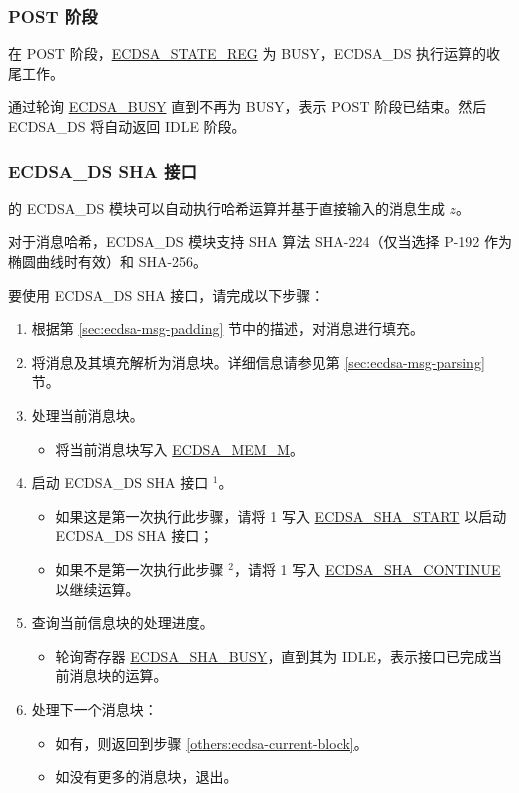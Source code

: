 \documentclass[main\_\_CN.tex]{subfiles}
\begin{document}
\subsubsection{POST 阶段}

在 POST 阶段，\hyperref[regdesc:ECDSASTATEREG]{ECDSA\_STATE\_REG} 为 BUSY，ECDSA\_DS 执行运算的收尾工作。

通过轮询 \hyperref[fielddesc:ECDSABUSY]{ECDSA\_BUSY} 直到不再为 BUSY，表示 POST 阶段已结束。然后 ECDSA\_DS 将自动返回 IDLE 阶段。

\subsubsection{ECDSA\_DS SHA 接口}
\label{sec:ecdsa-sha-interface}
\chipseries{} 的 ECDSA\_DS 模块可以自动执行哈希运算并基于直接输入的消息生成 $z$。

对于消息哈希，ECDSA\_DS 模块支持 SHA 算法 SHA-224（仅当选择 P-192 作为椭圆曲线时有效）和 SHA-256。

要使用 ECDSA\_DS SHA 接口，请完成以下步骤：

\begin{enumerate}
	\item 根据第 \ref{sec:ecdsa-msg-padding} 节中的描述，对消息进行填充。
	\item 将消息及其填充解析为消息块。详细信息请参见第 \ref{sec:ecdsa-msg-parsing} 节。
	\item \label{others:ecdsa-current-block} 处理当前消息块。
	      \begin{itemize}
		      \item 将当前消息块写入 \hyperref[tab:ecdsa-memory]{ECDSA\_MEM\_M}。
	      \end{itemize}
	\item 启动 ECDSA\_DS SHA 接口 \hyperref[others:ecdsa-note-sha]{$^1$}。
	      \begin{itemize}
		      \item 如果这是第一次执行此步骤，请将 1 写入 \hyperref[fielddesc:ECDSASHASTART]{ECDSA\_SHA\_START} 以启动 ECDSA\_DS SHA 接口；
		      \item 如果不是第一次执行此步骤 \hyperref[others:ecdsa-note-sha]{$^2$}，请将 1 写入 \hyperref[fielddesc:ECDSASHACONTINUE]{ECDSA\_SHA\_CONTINUE} 以继续运算。
	      \end{itemize}
	\item 查询当前信息块的处理进度。
	      \begin{itemize}
		      \item 轮询寄存器 \hyperref[fielddesc:ECDSASHABUSY]{ECDSA\_SHA\_BUSY}，直到其为 IDLE，表示接口已完成当前消息块的运算。
	      \end{itemize}

	\item 处理下一个消息块：
	      \begin{itemize}
		      \item 如有，则返回到步骤 \ref{others:ecdsa-current-block}。
		      \item 如没有更多的消息块，退出。
	      \end{itemize}

\end{enumerate}
\end{document}
